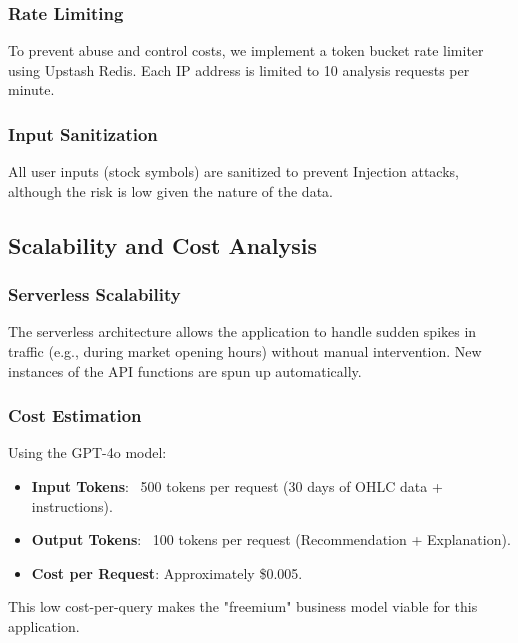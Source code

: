 \subsubsection{Rate Limiting}
To prevent abuse and control costs, we implement a token bucket rate limiter using Upstash Redis. Each IP address is limited to 10 analysis requests per minute.
\subsubsection{Input Sanitization}
All user inputs (stock symbols) are sanitized to prevent Injection attacks, although the risk is low given the nature of the data.

\subsection{Scalability and Cost Analysis}
\subsubsection{Serverless Scalability}
The serverless architecture allows the application to handle sudden spikes in traffic (e.g., during market opening hours) without manual intervention. New instances of the API functions are spun up automatically.
\subsubsection{Cost Estimation}
Using the GPT-4o model:
\begin{itemize}
    \item \textbf{Input Tokens}: ~500 tokens per request (30 days of OHLC data + instructions).
    \item \textbf{Output Tokens}: ~100 tokens per request (Recommendation + Explanation).
    \item \textbf{Cost per Request}: Approximately \$0.005.
\end{itemize}
This low cost-per-query makes the "freemium" business model viable for this application.
